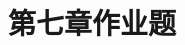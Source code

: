 \documentclass{article}
\begin{document}
\title{第七章作业题}
\begin{CJK}{UTF8}{gbsn}
  \newtheorem*{Exercise}{习题}
  \date{}
  \maketitle

  
  
  
  
  
  
  
  
  
  
  
  
  
  
  
  
  
  
\end{CJK}
\end{document}

